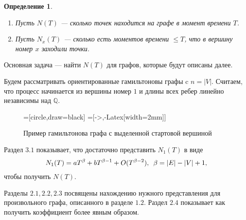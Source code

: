 \documentclass{article}
\newcommand{\squad}{
    \hspace{0.5em}
}
\newtheorem{definition}{Определение}
\begin{document}
\begin{definition} $ $
    \begin{enumerate}
        \item Пусть $N(T)$ --- сколько точек находится на графе в момент времени $T$.
        \item Пусть $N_{x}(T)$ --- сколько есть моментов времени $\leq T$, что в вершину номер $x$ заходили точки.
    \end{enumerate}
\end{definition}

Основная задача --- найти $N(T)$ для графов, которые будут описаны далее.

Будем рассматривать ориентированные гамильтоновы графы c $n = |V|$.
Считаем, что процесс начинается из вершины номер $1$ и длины всех ребер линейно независимы над $\mathbb{Q}$. 

\begin{figure}[!htb]
\begin{center}
=[circle,draw=black]
=[->,-{Latex[width=2mm]}]
\caption{Пример гамильтонова графа с выделенной стартовой вершиной}
\label{fig:graph}  
\end{center}
\end{figure}

Раздел $3.1$ показывает, что достаточно представить $N_{1}(T)$ в виде
\begin{gather*}
N_{1}(T) = aT^{\beta} + bT^{\beta - 1} + O(T^{\beta - 2}), \squad \beta = |E| - |V| + 1,    
\end{gather*} 
чтобы получить $N(T)$.

Разделы $2.1, 2.2, 2.3$ посвящены нахождению нужного представления для произвольного графа, описанного в разделе $1.2$. Раздел $2.4$ показывает как получить коэффициент более явным образом.
\end{document}
